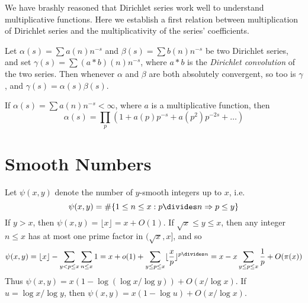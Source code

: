 We have brashly reasoned that Dirichlet series work well to understand multiplicative functions. Here we establish a first relation between multiplication of Dirichlet series and the multiplicativity of the series' coefficients.

\begin{theorem}
    Let $\alpha(s) = \sum a(n) n^{-s}$ and $\beta(s) = \sum b(n) n^{-s}$ be two Dirichlet series, and set $\gamma(s) = \sum (a * b)(n) n^{-s}$, where $a * b$ is the {\it Dirichlet convolution} of the two series. Then whenever $\alpha$ and $\beta$ are both absolutely convergent, so too is $\gamma$, and $\gamma(s) = \alpha(s) \beta(s)$.
\end{theorem}

\begin{theorem}
    If $\alpha(s) = \sum a(n) n^{-s} < \infty$, where $a$ is a multiplicative function, then
    \[ \alpha(s) = \prod_p \left( 1 + a(p) p^{-s} + a(p^2) p^{-2s} + \dots \right) \]
\end{theorem}

\section{Smooth Numbers}

Let $\psi(x,y)$ denote the number of $y$-smooth integers up to $x$, i.e.
%
\[ \psi(x,y) = \# \{ 1 \leq n \leq x : p \divides n \Rightarrow p \leq y \} \]
%
If $y > x$, then $\psi(x,y) = \lfloor x \rfloor = x + O(1)$. If $\sqrt{x} \leq y \leq x$, then any integer $n \leq x$ has at most one prime factor in $(\sqrt{x}, x]$, and so
%
\[ \psi(x,y) = \lfloor x \rfloor - \sum_{y < p \leq x} \sum_{n \leq x} 1 = x + o(1) + \sum_{y \leq p \leq x} \lfloor \frac{x}{p} \rfloor^{p \divides n} = x - x \sum_{y \leq p \leq x} \frac{1}{p} + O(\pi(x)) \]
%
Thus $\psi(x,y) = x(1 - \log(\log x/ \log y)) + O(x/\log x)$. If $u = \log x/ \log y$, then $\psi(x,y) = x(1 - \log u) + O(x/\log x)$.

